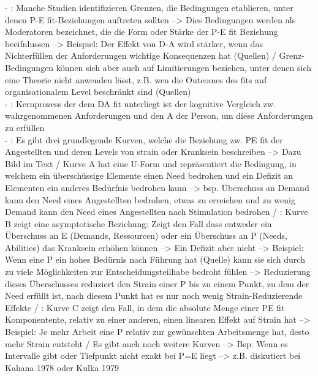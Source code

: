 - \cite[S. 6]{edwards:2008}: Manche Studien identifizieren Grenzen, die Bedingungen etablieren, unter denen P-E fit-Beziehungen auftreten sollten --> Dies Bedingungen werden als Moderatoren bezeichnet, die die Form oder Stärke der P-E fit Beziehung beeifnlussen --> Beispiel: Der Effekt von D-A wird stärker, wenn das Nichterfüllen der Anforderungen wichtige Konsequenzen hat (Quellen) / Grenz-Bedingungen können sich aber auch auf Limitierungen beziehen, unter denen sich eine Theorie nicht anwenden lässt, z.B. wen die Outcomes des fits auf organisationalem Level beschränkt sind (Quellen) \\
- \cite[S. 5f.]{edwards:1996}: Kernprozess der dem DA fit unterliegt ist der kognitive Vergleich zw. wahrgenommenen Anforderungen und den A der Person, um diese Anforderungen zu erfüllen\\
- \cite[S. 5]{caplan:1987}: Es gibt drei grundlegende Kurven, welche die Beziehung zw. PE fit der Angestellten und deren Levels von strain oder Kranksein beschreiben --> Dazu Bild im Text / Kurve A hat eine U-Form und repräsentiert die Bedingung, in welchem ein überschüssige Elemente einen Need bedrohen und ein Defizit an Elementen ein anderes Bedürfnis bedrohen kann --> bsp. Überschuss an Demand kann den Need eines Angestellten bedrohen, etwas zu erreichen und zu wenig Demand kann den Need eines Angestellten nach Stimulation bedrohen / \cite[S. 5f.]{caplan:1987}: Kurve B zeigt eine asymptotische Beziehung: Zeigt den Fall dass entweder ein Überschuss an E (Demands, Ressourcen) oder ein Überschuss an P (Needs, Abilities) das Kranksein erhöhen können --> Ein Defizit aber nicht --> Beispiel: Wenn eine P ein hohes Bedürnis nach Führung hat (Quelle) kann sie sich durch zu viele Möglichkeiten zur Entscheidungsteilhabe bedroht fühlen --> Reduzierung dieses Überschusses reduziert den Strain einer P bis zu einem Punkt, zu dem der Need erfüllt ist, nach diesem Punkt hat es nur noch wenig Strain-Reduzierende Effekte / \cite[S. 6]{caplan:1987}: Kurve C zeigt den Fall, in dem die absolute Menge einer PE fit Komponentente, relativ zu einer anderen, einen linearen Effekt auf Strain hat --> Beispiel: Je mehr Arbeit eine P relativ zur gewünschten Arbeitsmenge hat, desto mehr Strain entsteht / Es gibt auch noch weitere Kurven --> Bsp: Wenn es Intervalle gibt oder Tiefpunkt nicht exakt bei P=E liegt --> z.B. diskutiert bei Kahana 1978 oder Kulka 1979 \\
